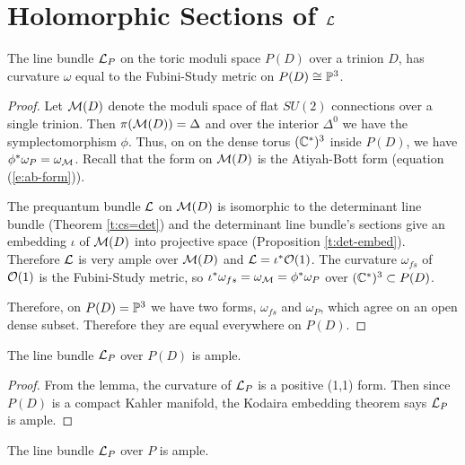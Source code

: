 \section{Holomorphic Sections of $\mathcal{L}$}
	\begin{lemma}
		The line bundle $\mathcal{L}_P$ on the toric moduli space $P(D)$ over a trinion $D$, has curvature $\omega$ equal to the Fubini-Study metric on $P(D) \cong \mathbb{P}^3$.
	\end{lemma}
	\begin{proof}
		Let $\mathcal{M}(D)$ denote the moduli space of flat $SU(2)$ connections over a single trinion. Then $\pi(\mathcal{M}(D)) = \Delta$ and over the interior $\Delta^{0}$ we have the symplectomorphism $\phi$. Thus, on on the dense torus $(\mathbb{C}^\ast)^3$ inside $P(D)$, we have $\phi^\ast \omega_P = \omega_{\mathcal{M}}$. Recall that the form on $\mathcal{M}(D)$ is the Atiyah-Bott form (equation (\ref{e:ab-form})).
		
		The prequantum bundle $\mathcal{L}$ on $\mathcal{M}(D)$ is isomorphic to the determinant line bundle (Theorem \ref{t:cs=det}) and the determinant line bundle's sections give an embedding $\iota$ of $\mathcal{M}(D)$ into projective space (Proposition \ref{t:det-embed}). Therefore $\mathcal{L}$ is very ample over $\mathcal{M}(D)$ and $\mathcal{L} = \iota^\ast \mathcal{O}(1)$. The curvature $\omega_{fs}$ of $\mathcal{O}(1)$ is the Fubini-Study metric, so $\iota^\ast \omega_{fs} = \omega_{\mathcal{M}} = \phi^\ast \omega_P$ over $(\mathbb{C}^\ast)^3 \subset P(D)$.
		
		Therefore, on $P(D) = \mathbb{P}^3$ we have two forms, $\omega_{fs}$ and $\omega_P$, which agree on an open dense subset. Therefore they are equal everywhere on $P(D)$.
	\end{proof}
	\begin{corollary}
		\label{t:P3-veryample}
		The line bundle $\mathcal{L}_P$ over $P(D)$ is ample.
	\end{corollary}
	\begin{proof}
		From the lemma, the curvature of $\mathcal{L}_P$ is a positive (1,1) form. Then since $P(D)$ is a compact Kahler manifold, the Kodaira embedding theorem says $\mathcal{L}_P$ is ample.
	\end{proof}
	\begin{theorem}
		\label{t:lp-ample}
		The line bundle $\mathcal{L}_P$ over $P$ is ample. 
	\end{theorem}
